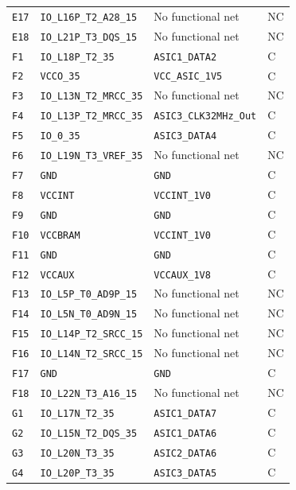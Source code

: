 \documentclass[10pt,a4paper]{article}
\begin{document}
\begin{longtable}{@{}P{15mm}P{42mm}P{92mm}P{10mm}@{}}
\nolinkurl{E17} & \nolinkurl{IO_L16P_T2_A28_15} & No functional net & NC \\
\nolinkurl{E18} & \nolinkurl{IO_L21P_T3_DQS_15} & No functional net & NC \\
\nolinkurl{F1} & \nolinkurl{IO_L18P_T2_35} & \nolinkurl{ASIC1_DATA2} & C \\
\nolinkurl{F2} & \nolinkurl{VCCO_35} & \nolinkurl{VCC_ASIC_1V5} & C \\
\nolinkurl{F3} & \nolinkurl{IO_L13N_T2_MRCC_35} & No functional net & NC \\
\nolinkurl{F4} & \nolinkurl{IO_L13P_T2_MRCC_35} & \nolinkurl{ASIC3_CLK32MHz_Out} & C \\
\nolinkurl{F5} & \nolinkurl{IO_0_35} & \nolinkurl{ASIC3_DATA4} & C \\
\nolinkurl{F6} & \nolinkurl{IO_L19N_T3_VREF_35} & No functional net & NC \\
\nolinkurl{F7} & \nolinkurl{GND} & \nolinkurl{GND} & C \\
\nolinkurl{F8} & \nolinkurl{VCCINT} & \nolinkurl{VCCINT_1V0} & C \\
\nolinkurl{F9} & \nolinkurl{GND} & \nolinkurl{GND} & C \\
\nolinkurl{F10} & \nolinkurl{VCCBRAM} & \nolinkurl{VCCINT_1V0} & C \\
\nolinkurl{F11} & \nolinkurl{GND} & \nolinkurl{GND} & C \\
\nolinkurl{F12} & \nolinkurl{VCCAUX} & \nolinkurl{VCCAUX_1V8} & C \\
\nolinkurl{F13} & \nolinkurl{IO_L5P_T0_AD9P_15} & No functional net & NC \\
\nolinkurl{F14} & \nolinkurl{IO_L5N_T0_AD9N_15} & No functional net & NC \\
\nolinkurl{F15} & \nolinkurl{IO_L14P_T2_SRCC_15} & No functional net & NC \\
\nolinkurl{F16} & \nolinkurl{IO_L14N_T2_SRCC_15} & No functional net & NC \\
\nolinkurl{F17} & \nolinkurl{GND} & \nolinkurl{GND} & C \\
\nolinkurl{F18} & \nolinkurl{IO_L22N_T3_A16_15} & No functional net & NC \\
\nolinkurl{G1} & \nolinkurl{IO_L17N_T2_35} & \nolinkurl{ASIC1_DATA7} & C \\
\nolinkurl{G2} & \nolinkurl{IO_L15N_T2_DQS_35} & \nolinkurl{ASIC1_DATA6} & C \\
\nolinkurl{G3} & \nolinkurl{IO_L20N_T3_35} & \nolinkurl{ASIC2_DATA6} & C \\
\nolinkurl{G4} & \nolinkurl{IO_L20P_T3_35} & \nolinkurl{ASIC3_DATA5} & C \\

\end{longtable}
\end{document}
